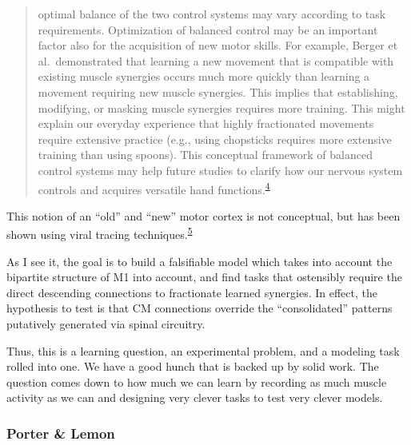 {\begin{quote}
            optimal balance of the two control systems may vary
            according to task requirements. Optimization of balanced
            control may be an important factor also for the acquisition
            of new motor skills. For example, Berger et al.~demonstrated
            that learning a new movement that is compatible with
            existing muscle synergies occurs much more quickly than
            learning a movement requiring new muscle synergies. This
            implies that establishing, modifying, or masking muscle
            synergies requires more training. This might explain our
            everyday experience that highly fractionated movements
            require extensive practice (e.g., using chopsticks requires
            more extensive training than using spoons). This conceptual
            framework of balanced control systems may help future
            studies to clarify how our nervous system controls and
            acquires versatile hand
            functions.\textsuperscript{\protect\hyperlink{ref-Takei2017}{4}}
            \end{quote}

            This notion of an ``old'' and ``new'' motor cortex is not
            conceptual, but has been shown using viral tracing
            techniques.\textsuperscript{\protect\hyperlink{ref-Rathelot2009}{5}}

            As I see it, the goal is to build a falsifiable model which
            takes into account the bipartite structure of M1 into
            account, and find tasks that ostensibly require the direct
            descending connections to fractionate learned synergies. In
            effect, the hypothesis to test is that CM connections
            override the ``consolidated'' patterns putatively generated
            via spinal circuitry.

            Thus, this is a learning question, an experimental problem,
            and a modeling task rolled into one. We have a good hunch
            that is backed up by solid work. The question comes down to
            how much we can learn by recording as much muscle activity
            as we can and designing very clever tasks to test very
            clever models.

            \hypertarget{porter-lemon}{%
            \subsubsection{Porter \& Lemon}\label{porter-lemon}}

}
